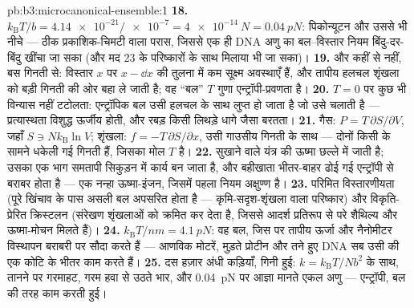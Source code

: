 \begin{solution}{pb:b3:microcanonical-ensemble:1}
\textbf{18.} $k_{\text{B}}T/b = \num{4.14e-21}/\num{e-7} =
\qty{4e-14}{N} = \qty{0.04}{pN}$: पिकोन्यूटन और उससे भी नीचे ---
ठीक प्रकाशिक-चिमटी वाला परास, जिससे एक ही DNA अणु का बल--विस्तार
नियम बिंदु-दर-बिंदु खींचा जा सका (और मद 23 के परिष्कारों के साथ
मिलाया भी जा सका)।
\textbf{19.} और कहीं से नहीं, बस गिनती से: विस्तार $x$ पर
$x - \dd x$ की तुलना में कम सूक्ष्म अवस्थाएँ हैं, और तापीय हलचल
शृंखला को बड़ी गिनती की ओर बहा ले जाती है; वह ``बल''
$T$ गुणा एन्ट्रॉपी-प्रवणता है।
\textbf{20.} $T = 0$ पर कुछ भी विन्यास नहीं टटोलता: एन्ट्रॉपिक
बल उसी हलचल के साथ लुप्त हो जाता है जो उसे चलाती है ---
प्रत्यास्थता विशुद्ध ऊर्जीय होती, और रबड़ किसी लिथड़े धागे जैसा
बरतता।
\textbf{21.} गैस: $P = T\,\partial S/\partial V$, जहाँ $S \ni
Nk_{\text{B}}\ln V$; शृंखला: $f = -T\,\partial S/\partial x$, उसी
गाउसीय गिनती के साथ --- दोनों किसी  के सामने धकेली गई
गिनती हैं, जिसका मोल $T$ है।
\textbf{22.} सुखाने वाले यंत्र की ऊष्मा छल्ले में जाती है; उसका
एक भाग समतापी सिकुड़न में कार्य बन जाता है, और बहीखाता भीतर-बाहर
ढोई गई एन्ट्रॉपी से बराबर होता है --- एक नन्हा ऊष्मा-इंजन, जिसमें
पहला नियम अक्षुण्ण है।
\textbf{23.} परिमित विस्तारणीयता (पूरे खिंचाव के पास असली बल
अपसरित होता है --- कृमि-सदृश-शृंखला वाला परिष्कार) और
विकृति-प्रेरित क्रिस्टलन (संरेखण शृंखलाओं को क्रमित कर देता है,
जिससे आदर्श प्रतिरूप से परे शैथिल्य और ऊष्मा-मोचन मिलते हैं)।
\textbf{24.} $k_{\text{B}}T/\unit{nm} = \qty{4.1}{pN}$: वह बल,
जिस पर तापीय ऊर्जा और नैनोमीटर विस्थापन बराबरी पर सौदा करते हैं ---
आणविक मोटरें, मुड़ते प्रोटीन और तने हुए DNA सब उसी की एक कोटि के
भीतर काम करते हैं।
\textbf{25.} दस हज़ार अंधी कड़ियाँ, गिनी हुई: 
$k = k_{\text{B}}T/Nb^2$ के साथ, तानने पर गरमाहट, गरम हवा से उठते
भार, और \qty{0.04}{pN} पर आज्ञा मानते एकल अणु ---
एन्ट्रॉपी, बल की तरह काम करती हुई।
\end{solution}
